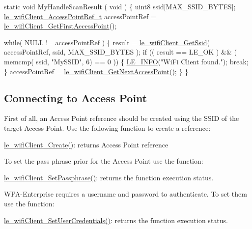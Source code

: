 \begin{DoxyCode}
\textcolor{keyword}{static} \textcolor{keywordtype}{void} MyHandleScanResult
(
    \textcolor{keywordtype}{void}
)
\{
    uint8 ssid[MAX\_SSID\_BYTES];
    \hyperlink{le__wifi_client__interface_8h_a5a5709045b59550dbb52ff13a7d24c1e}{le\_wifiClient\_AccessPointRef\_t} accessPointRef = 
      \hyperlink{le__wifi_client__interface_8h_a284c452c5bd4309e096b6f89a8da653e}{le\_wifiClient\_GetFirstAccessPoint}();

    \textcolor{keywordflow}{while}( NULL != accessPointRef )
    \{
         result = \hyperlink{le__wifi_client__interface_8h_aa726f6cb7f78e9ed962a6c6d3ae75a91}{le\_wifiClient\_GetSsid}( accessPointRef, ssid, MAX\_SSID\_BYTES );
         \textcolor{keywordflow}{if} (( result == LE\_OK ) && ( memcmp( ssid, \textcolor{stringliteral}{"MySSID"}, 6) == 0 ))
         \{
              \hyperlink{le__log_8h_a23e6d206faa64f612045d688cdde5808}{LE\_INFO}(\textcolor{stringliteral}{"WiFi Client found."});
              \textcolor{keywordflow}{break};
         \}
         accessPointRef = \hyperlink{le__wifi_client__interface_8h_ab566a61f36b25118f9f38d62863361d2}{le\_wifiClient\_GetNextAccessPoint}();
    \}
\}
\end{DoxyCode}
\hypertarget{c_le_wifi_client_le_wifiClient_connect_to_ap}{}\subsection{Connecting to Access Point}\label{c_le_wifi_client_le_wifiClient_connect_to_ap}
First of all, an Access Point reference should be created using the S\+S\+ID of the target Access Point. Use the following function to create a reference\+:
\begin{DoxyItemize}
\item \hyperlink{le__wifi_client__interface_8h_a96542be7e54ff8373aa0d8b0f5e540c7}{le\+\_\+wifi\+Client\+\_\+\+Create()}\+: returns Access Point reference
\end{DoxyItemize}

To set the pass phrase prior for the Access Point use the function\+:
\begin{DoxyItemize}
\item \hyperlink{le__wifi_client__interface_8h_a398b877814bde1cd3054f2f59d0f6b8b}{le\+\_\+wifi\+Client\+\_\+\+Set\+Passphrase()}\+: returns the function execution status.
\end{DoxyItemize}

W\+P\+A-\/\+Enterprise requires a username and password to authenticate. To set them use the function\+:
\begin{DoxyItemize}
\item \hyperlink{le__wifi_client__interface_8h_a362429a884a24cf6e33415e111f0b522}{le\+\_\+wifi\+Client\+\_\+\+Set\+User\+Credentials()}\+: returns the function execution status.
\end{DoxyItemize}

